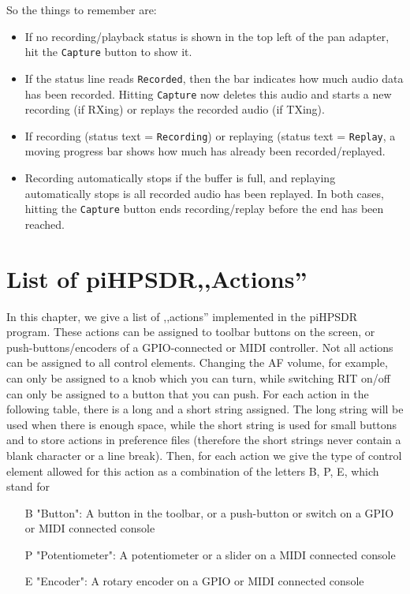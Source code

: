 \documentclass[12pt]{book}
\def\rett#1{\texttt{\color{red}#1}}
\def\bltt#1{\texttt{\color{blue}#1}}
\def\pH{pi\-HPSDR\xspace}
\begin{document}
So the things to remember are:
\begin{itemize}
\item{If no recording/playback status is shown in the top left of the pan adapter, hit the  \bltt{Capture} button
to show it.}
\item{If the status line reads \rett{Recorded}, then the bar indicates how much audio data has been recorded. Hitting
\bltt{Capture} now deletes this audio and starts a new recording (if RXing) or replays the recorded audio
(if TXing).}
\item{If recording (status text = \rett{Recording}) or replaying (status text = \rett{Replay}, a moving progress
bar shows how much has already been recorded/replayed.}
\item{Recording automatically stops if the buffer is full, and replaying automatically stops is all recorded audio
has been replayed. In both cases, hitting the \bltt{Capture} button ends recording/replay before the end has been reached.}
\end{itemize}


\appendix
\chapter{List of \pH ,,Actions''}
\label{sec:actionlist}

In this chapter, we give a list of ,,actions'' implemented in the \pH program. These actions can be
assigned to toolbar buttons on the screen, or push-buttons/encoders of a GPIO-connected or MIDI controller.
Not all actions can be assigned to all control elements. Changing the AF volume, for example, can only be
assigned to a knob
which you can turn, while switching RIT on/off can only be assigned to a button that you can push. For each
action in the following table, there is a long and a short string assigned. The long string will be used
when there is enough space, while the short string is used for small buttons and to store actions in
preference files (therefore the short strings never contain a blank character or a line break). Then, for
each action we give the type of control element allowed for this action as a combination of the letters B,
P, E, which stand for

\begin{itemize}[font=\texttt, left=0pt]
\item[B] {"Button": A button in the toolbar, or a push-button or switch on a GPIO or MIDI connected console}
\item[P] {"Potentiometer": A potentiometer or a slider on a MIDI connected console}
\item[E] {"Encoder": A rotary encoder on a GPIO or MIDI connected console}
\end{itemize}
\end{document}
